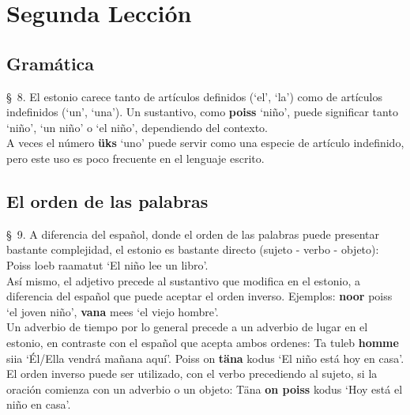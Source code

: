 
\chapter{Segunda Lección} %

\label{ch:lesson02} %


\Large{\section{Gramática}}

\S\ 8. El estonio carece tanto de artículos definidos (`el', `la') como de artículos indefinidos (`un', `una'). Un sustantivo, como \textbf{poiss} `niño', puede significar tanto `niño', `un niño' o `el niño', dependiendo del contexto.\\

A veces el número \textbf{üks} `uno' puede servir como una especie de artículo indefinido, pero este uso es poco frecuente en el lenguaje escrito.\\

\Large{\section{El orden de las palabras}}

\S\ 9. A diferencia del español, donde el orden de las palabras puede presentar bastante complejidad, el estonio es bastante directo (sujeto - verbo - objeto): Poiss loeb raamatut `El niño lee un libro'.\\

Así mismo, el adjetivo precede al sustantivo que modifica en el estonio, a diferencia del español que puede aceptar el orden inverso. Ejemplos: \textbf{noor} poiss `el joven niño', \textbf{vana} mees `el viejo hombre'.\\

Un adverbio de tiempo por lo general precede a un adverbio de lugar en el estonio, en contraste con el español que acepta ambos ordenes: Ta tuleb \textbf{homme} siia `Él/Ella vendrá mañana aquí'. Poiss on \textbf{täna} kodus `El niño está hoy en casa'.\\

El orden inverso puede ser utilizado, con el verbo precediendo al sujeto, si la oración comienza con un adverbio o un objeto: Täna \textbf{on poiss} kodus `Hoy está el niño en casa'.\\

